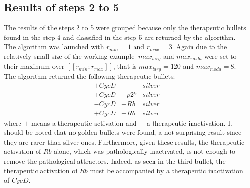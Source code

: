 \documentclass[oneside,a4paper,onecolumn,notitlepage,final]{article}
\begin{document}
\subsection{Results of steps 2 to 5}
The results of the steps 2 to 5 were grouped because only the therapeutic bullets found in the step 4 and classified in the step 5 are returned by the algorithm. The algorithm was launched with $r_{min}=1$ and $r_{max}=3$. Again due to the relatively small size of the working example, $max_{targ}$ and $max_{moda}$ were set to their maximum over $[\![r_{min};r_{max}]\!]$, that is $max_{targ}=120$ and $max_{moda}=8$. The algorithm returned the following therapeutic bullets:
\begin{equation*}
\begin{matrix}
+CycD&&silver\\
+CycD&-p27&silver\\
-CycD&+Rb&silver\\
+CycD&-Rb&silver
\end{matrix}
\end{equation*}
where $+$ means a therapeutic activation and $-$ a therapeutic inactivation. It should be noted that no golden bullets were found, a not surprising result since they are rarer than silver ones. Furthermore, given these results, the therapeutic activation of $Rb$ alone, which was pathologically inactivated, is not enough to remove the pathological attractors. Indeed, as seen in the third bullet, the therapeutic activation of $Rb$ must be accompanied by a therapeutic inactivation of $CycD$.
\end{document}
